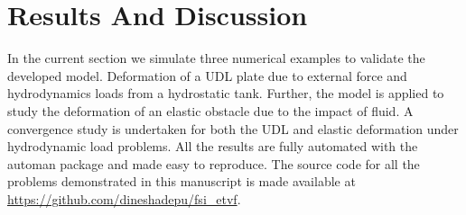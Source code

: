 \section{Results And Discussion}\label{sec3}
In the current section we simulate three numerical examples to validate the
developed model. Deformation of a UDL plate due to external force and
hydrodynamics loads from a hydrostatic tank. Further, the model is applied to
study the deformation of an elastic obstacle due to the impact of fluid. A
convergence study is undertaken for both the UDL and elastic deformation under
hydrodynamic load problems. All the results are fully automated with the automan
package \citep{automan2018} and made easy to reproduce. The source code for all
the problems demonstrated in this manuscript is made available at
\url{https://github.com/dineshadepu/fsi_etvf}.

